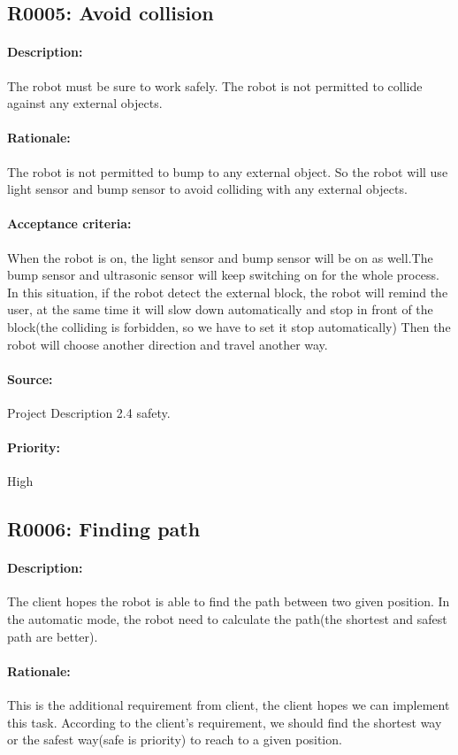 \documentclass[11pt, a4paper]{report}
\begin{document}
\subsection{R0005: Avoid collision}
\paragraph{Description:}
The robot must be sure to work safely. The robot is not permitted to collide against any external objects.
\paragraph{Rationale:}
The robot is not permitted to bump to any external object. So the robot will use light sensor and bump sensor to avoid colliding with any external objects.
\paragraph{Acceptance criteria:}
When the robot is on, the light sensor and bump sensor will be on as well.The bump sensor and ultrasonic sensor will keep switching on for the whole process. In this situation, if the robot detect the external block, the robot will remind the user, at the same time it will slow down automatically and stop in front of the block(the colliding is forbidden, so we have to set it stop automatically) Then the robot will choose another direction and travel another way.
\paragraph{Source:}
Project Description 2.4 safety.  
\paragraph{Priority:}
High


\subsection{R0006: Finding path }
\paragraph{Description:}
The client hopes the robot is able to find the path between two given position. In the automatic mode, the robot need to calculate the path(the shortest and safest path are better).    
\paragraph{Rationale:}
This is the additional requirement from client, the client hopes we can implement this task. According to the client's requirement, we should find the shortest way or the safest way(safe is priority) to reach to a given position. 
\end{document}
